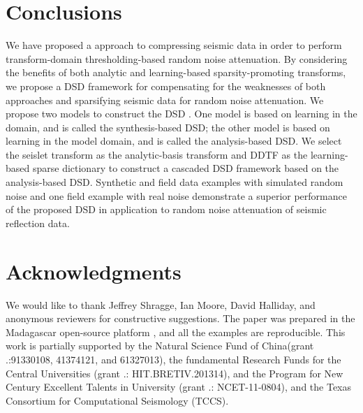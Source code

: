 \section{Conclusions}
We have proposed a  approach to compressing seismic data in order to perform transform-domain thresholding-based random noise attenuation. By considering the benefits of both analytic and learning-based sparsity-promoting transforms, we propose a DSD framework for compensating for the weaknesses of both approaches and sparsifying seismic data for random noise attenuation.  We propose two models to construct the DSD . One model is based on learning in the  domain, and is called the synthesis-based DSD; the other model is based on learning in the model domain, and is called the analysis-based DSD.  We select the seislet transform as the analytic-basis transform and DDTF as the learning-based sparse dictionary to construct a cascaded DSD framework based on the analysis-based DSD.  Synthetic and field data examples with simulated random noise and one field  example with real noise demonstrate a superior performance of the proposed DSD in application to random noise attenuation of seismic reflection data. 

\section{Acknowledgments}
We would like to thank  Jeffrey Shragge, Ian Moore, David Halliday, and  anonymous reviewers for constructive suggestions. The paper was prepared in the Madagascar open-source platform \cite[]{mada2013}, and all the examples are reproducible. This work is partially supported by the Natural Science Fund of China(grant .:91330108, 41374121, and 61327013), the fundamental Research Funds for the Central Universities (grant .: HIT.BRETIV.201314), and the Program for New Century Excellent Talents in University (grant .: NCET-11-0804), and the Texas Consortium for Computational Seismology (TCCS).




